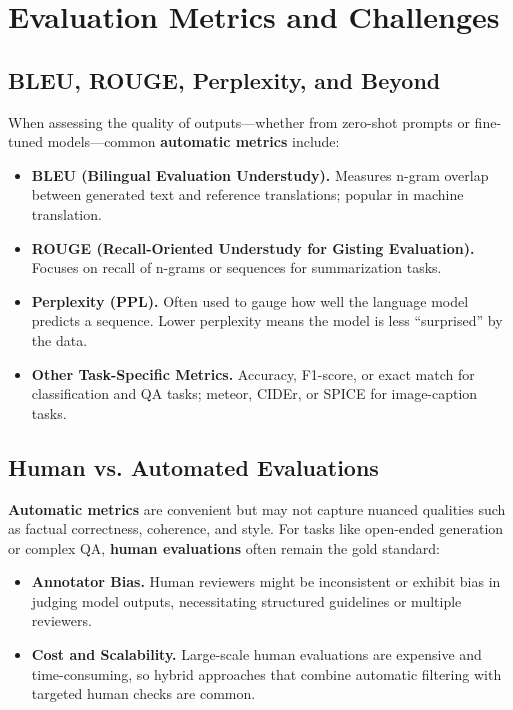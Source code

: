 \section{Evaluation Metrics and Challenges}
\label{sec:metrics_challenges}

\subsection{BLEU, ROUGE, Perplexity, and Beyond}
\noindent
When assessing the quality of outputs—whether from zero-shot prompts or fine-tuned models—common \textbf{automatic metrics} include:
\begin{itemize}
    \item \textbf{BLEU (Bilingual Evaluation Understudy).} Measures n-gram overlap between generated text and reference translations; popular in machine translation.
    \item \textbf{ROUGE (Recall-Oriented Understudy for Gisting Evaluation).} Focuses on recall of n-grams or sequences for summarization tasks.
    \item \textbf{Perplexity (PPL).} Often used to gauge how well the language model predicts a sequence. Lower perplexity means the model is less “surprised” by the data.
    \item \textbf{Other Task-Specific Metrics.} Accuracy, F1-score, or exact match for classification and QA tasks; meteor, CIDEr, or SPICE for image-caption tasks.
\end{itemize}

\subsection{Human vs. Automated Evaluations}
\noindent
\textbf{Automatic metrics} are convenient but may not capture nuanced qualities such as factual correctness, coherence, and style. For tasks like open-ended generation or complex QA, \textbf{human evaluations} often remain the gold standard:
\begin{itemize}
    \item \textbf{Annotator Bias.} Human reviewers might be inconsistent or exhibit bias in judging model outputs, necessitating structured guidelines or multiple reviewers.
    \item \textbf{Cost and Scalability.} Large-scale human evaluations are expensive and time-consuming, so hybrid approaches that combine automatic filtering with targeted human checks are common.
\end{itemize}

